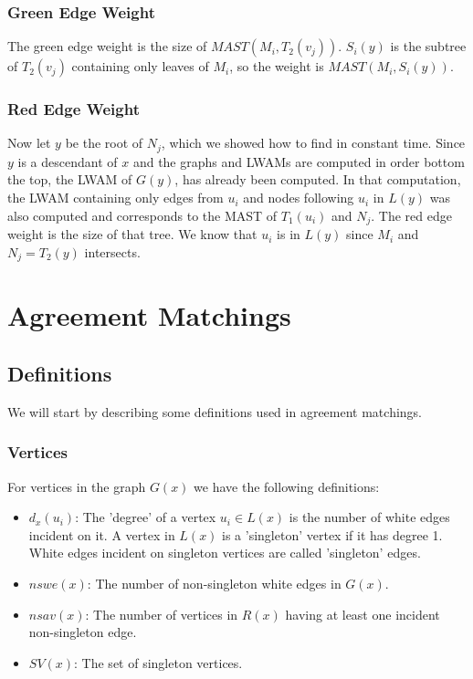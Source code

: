 \subsubsection{Green Edge Weight}
The green edge weight is the size of $MAST(M_i,T_2(v_j))$. $S_i(y)$ is the subtree of $T_2(v_j)$ containing only leaves of $M_i$, so the weight is $MAST(M_i, S_i(y))$.

\subsubsection{Red Edge Weight}
Now let $y$ be the root of $N_j$, which we showed how to find in constant time. Since $y$ is a descendant of $x$ and the graphs and LWAMs are computed in order bottom the top, the LWAM of $G(y)$, has already been computed. In that computation, the LWAM containing only edges from $u_i$ and nodes following $u_i$ in $L(y)$ was also computed and corresponds to the MAST of $T_1(u_i)$ and $N_j$. The red edge weight is the size of that tree. We know that $u_i$ is in $L(y)$ since $M_i$ and $N_j = T_2(y)$ intersects.

\section{Agreement Matchings}

\subsection{Definitions}
We will start by describing some definitions used in agreement matchings.

\subsubsection{Vertices}
For vertices in the graph $G(x)$ we have the following definitions:
\begin{itemize}
	\item $d_x(u_i)$: The 'degree' of a vertex $u_i \in L(x)$ is the number of white edges incident on it.
	\subitem A vertex in $L(x)$ is a 'singleton' vertex if it has degree 1.
	\subitem White edges incident on singleton vertices are called 'singleton' edges.
	\item $nswe(x)$: The number of non-singleton white edges in $G(x)$.
	\item $nsav(x)$: The number of vertices in $R(x)$ having at least one incident non-singleton edge.
	\item $SV(x)$: The set of singleton vertices.
\end{itemize}


